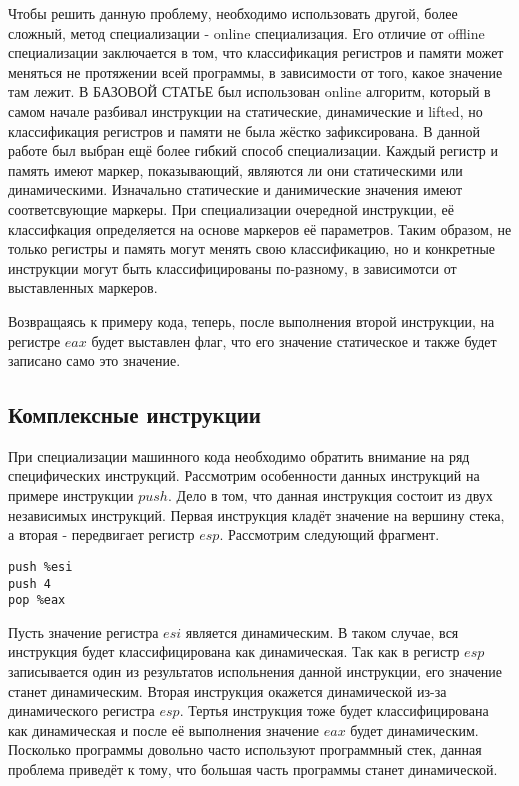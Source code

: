 \documentclass{spbau-diploma}
\begin{document}
Чтобы решить данную проблему, необходимо использовать другой, более сложный, метод специализации - online специализация. Его отличие от offline специализации заключается в том, что классификация регистров и памяти может меняться не протяжении всей программы, в зависимости от того, какое значение там лежит. В {\LARGE БАЗОВОЙ СТАТЬЕ} был использован online алгоритм, который в самом начале разбивал инструкции на статические, динамические и lifted, но классификация регистров и памяти не была жёстко зафиксирована. В данной работе был выбран ещё более гибкий способ специализации. Каждый регистр и память имеют маркер, показывающий, являются ли они статическими или динамическими. Изначально статические и данимические значения имеют соответсвующие маркеры. При специализации очередной инструкции, её классифкация определяется на основе маркеров её параметров. Таким образом, не только регистры и память могут менять свою классификацию, но и конкретные инструкции могут быть классифицированы по-разному, в зависимотси от выставленных маркеров.

Возвращаясь к примеру кода, теперь, после выполнения второй инструкции, на регистре $eax$ будет выставлен флаг, что его значение статическое и также будет записано само это значение.

\subsection{ Комплексные инструкции}
При специализации машинного кода необходимо обратить внимание на ряд специфических инструкций. Рассмотрим особенности данных инструкций на примере инструкции $push$. Дело в том, что данная инструкция состоит из двух независимых инструкций. Первая инструкция кладёт значение на вершину стека, а вторая - передвигает регистр $esp$. Рассмотрим следующий фрагмент.
\begin{lstlisting}
push %esi
push 4
pop %eax
\end{lstlisting}
Пусть значение регистра $esi$ является динамическим. В таком случае, вся инструкция будет классифицирована как динамическая. Так как в регистр $esp$ записывается один из результатов испольнения данной инструкции, его значение станет динамическим. Вторая инструкция окажется динамической из-за динамического регистра $esp$. Тертья инструкция тоже будет классифицирована как  динамическая и после её выполнения значение $eax$ будет динамическим. Посколько программы довольно часто используют программный стек, данная проблема приведёт к тому, что большая часть программы станет динамической.
\end{document}
